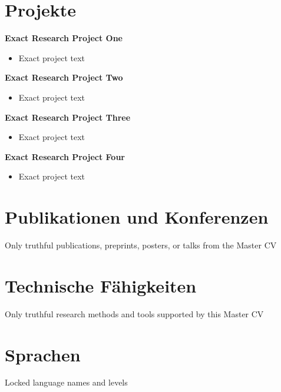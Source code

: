 \documentclass[a4paper,10pt]{article}
\begin{document}
\section*{Projekte}
\textbf{Exact Research Project One}\\
\begin{itemize}[leftmargin=1.5em, noitemsep]\item Exact project text\end{itemize}
\vspace{0.35em}
\textbf{Exact Research Project Two}\\
\begin{itemize}[leftmargin=1.5em, noitemsep]\item Exact project text\end{itemize}
\vspace{0.35em}
\textbf{Exact Research Project Three}\\
\begin{itemize}[leftmargin=1.5em, noitemsep]\item Exact project text\end{itemize}
\vspace{0.35em}
\textbf{Exact Research Project Four}\\
\begin{itemize}[leftmargin=1.5em, noitemsep]\item Exact project text\end{itemize}

\section*{Publikationen und Konferenzen}
Only truthful publications, preprints, posters, or talks from the Master CV

\section*{Technische Fähigkeiten}
Only truthful research methods and tools supported by this Master CV

\section*{Sprachen}
Locked language names and levels
\end{document}
